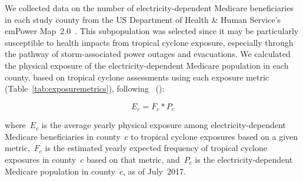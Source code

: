 We collected data on the number of electricity-dependent Medicare beneficiaries
in each study county from the \ac{US} Department of Health \& Human Service's
emPower Map~2.0~\parencite{empower}. This subpopulation was selected since it
may be particularly susceptible to health impacts from tropical cyclone
exposure, especially through the pathway of storm-associated power outages and
evacuations. We calculated the physical exposure of the electricity-dependent
Medicare population in each county, based on tropical cyclone assessments using
each exposure metric (Table~\ref{tab:exposuremetrics}), following
\citeauthor*{peduzzi2009assessing}~(\citeyear{peduzzi2009assessing}):

\begin{equation}
E_c = F_c * P_c
\end{equation}

\noindent where~$E_c$ is the average yearly physical exposure among
electricity-dependent Medicare beneficiaries in county~$c$ to tropical cyclone
exposures based on a given metric,~$F_c$ is the estimated yearly expected
frequency of tropical cyclone exposures in county~$c$ based on that metric,
and~$P_c$ is the electricity-dependent Medicare population in
county~$c$, as of July~2017. 



